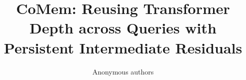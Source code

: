 \documentclass{article}
\title{CoMem: Reusing Transformer Depth across Queries with
Persistent Intermediate Residuals}
\author{Anonymous authors}
\begin{document}
\ifcolmsubmission
  \linenumbers
\fi
\maketitle







\FloatBarrier







\clearpage
\appendix
\raggedbottom


\end{document}
